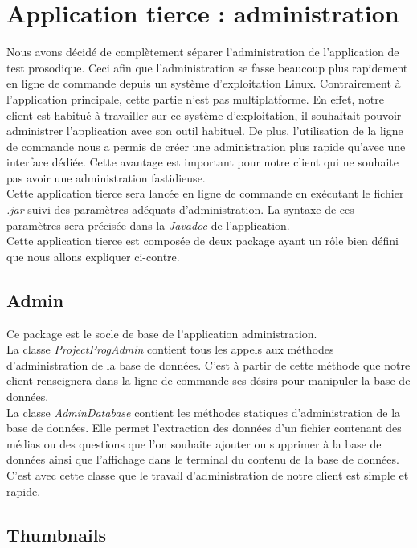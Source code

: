 \section{Application tierce : administration}

Nous avons décidé de complètement séparer l'administration de l'application de test prosodique. Ceci afin que l'administration se fasse beaucoup plus rapidement en ligne de commande depuis un système d'exploitation Linux. Contrairement à l'application principale, cette partie n'est pas multiplatforme. En effet, notre client est habitué à travailler sur ce système d'exploitation, il souhaitait pouvoir administrer l'application avec son outil habituel. De plus, l'utilisation de la ligne de commande nous a permis de créer une administration plus rapide qu'avec une interface dédiée. Cette avantage est important pour notre client qui ne souhaite pas avoir une administration fastidieuse.\\

Cette application tierce sera lancée en ligne de commande en exécutant le fichier \textit{.jar} suivi des paramètres adéquats d'administration. La syntaxe de ces paramètres sera précisée dans la \textit{Javadoc} de l'application.\\

Cette application tierce est composée de deux package ayant un rôle bien défini que nous allons expliquer ci-contre.

\subsection{Admin}

Ce package est le socle de base de l'application administration.\\
La classe \textit{ProjectProgAdmin} contient tous les appels aux méthodes d'administration de la base de données. C'est à partir de cette méthode que notre client renseignera dans la ligne de commande ses désirs pour manipuler la base de données.\\
La classe \textit{AdminDatabase} contient les méthodes statiques d'administration de la base de données. Elle permet l'extraction des données d'un fichier contenant des médias ou des questions que l'on souhaite ajouter ou supprimer à la base de données ainsi que l'affichage dans le terminal du contenu de la base de données. C'est avec cette classe que le travail d'administration de notre client est simple et rapide.

\subsection{Thumbnails}

